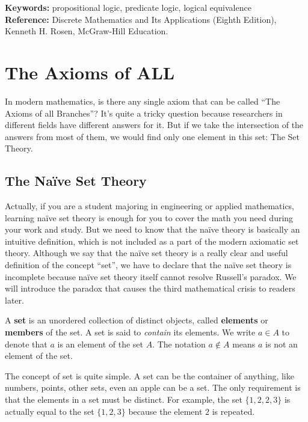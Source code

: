 \documentclass[oneside]{book}
\begin{document}
\vspace{1cm}
\noindent
\textbf{Keywords:} propositional logic, predicate logic, logical equivalence \\
\textbf{Reference:} Discrete Mathematics and Its Applications (Eighth Edition), Kenneth H. Rosen, McGraw-Hill Education.

\cleardoublepage

\chapter{The Axioms of ALL}
\renewcommand{\thesection}{\arabic{chapter}.\arabic{section}} %

In modern mathematics, is there any single axiom that can be called “The Axioms of all Branches”? It’s quite a tricky question because researchers in different fields have different answers for it. But if we take the intersection of the answers from most of them, we would find only one element in this set: The Set Theory.

\section{The Naïve Set Theory}
Actually, if you are a student majoring in engineering or applied mathematics, learning naïve set theory is enough for you to cover the math you need during your work and study. But we need to know that the naïve theory is basically an intuitive definition, which is not included as a part of the modern axiomatic set theory. Although we say that the naïve set theory is a really clear and useful definition of the concept “set”, we have to declare that the naïve set theory is incomplete because naïve set theory itself cannot resolve Russell's paradox. We will introduce the paradox that causes the third mathematical crisis to readers later.

\begin{definition}[Set]
A \textbf{set} is an unordered collection of distinct objects, called \textbf{elements} or \textbf{members} of the set. A set is said to \emph{contain} its elements. We write $a \in A$ to denote that $a$ is an element of the set $A$. The notation $a \notin A$ means $a$ is not an element of the set.
\end{definition}

The concept of set is quite simple. A set can be the container of anything, like numbers, points, other sets, even an apple can be a set. The only requirement is that the elements in a set must be distinct. For example, the set $\{1, 2, 2, 3\}$ is actually equal to the set $\{1, 2, 3\}$ because the element $2$ is repeated.
\end{document}
